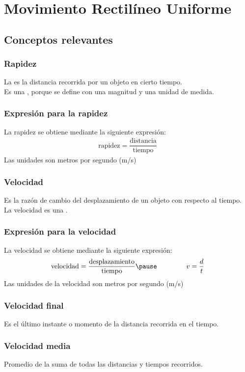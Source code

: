 \documentclass[14pt]{beamer}
\begin{document}
\section{Movimiento Rectilíneo Uniforme}
\subsection{Conceptos relevantes}

\begin{frame}
\frametitle{Rapidez}
La  es la distancia recorrida por un objeto en cierto tiempo.
\\
\bigskip
\pause
Es una , porque se define con una magnitud y una unidad de medida.
\end{frame}
\begin{frame}
\frametitle{Expresión para la rapidez}
La rapidez se obtiene mediante la siguiente expresión:
\pause
\begin{align*}
\text{rapidez} = \dfrac{\text{distancia}}{\text{tiempo}}
\end{align*}
Las unidades son metros por segundo (\unit[per-mode=symbol]{\meter\per\second})
\end{frame}
\begin{frame}
\frametitle{Velocidad}
Es la razón de cambio del desplazamiento de un objeto con respecto al tiempo.
\\
\bigskip
\pause
La velocidad es una .
\end{frame}
\begin{frame}
\frametitle{Expresión para la velocidad}
La velocidad se obtiene mediante la siguiente expresión:
\pause
\begin{eqnarray*}
\begin{aligned}
\text{velocidad} = \dfrac{\text{desplazamiento}}{\text{tiempo}} \pause \hspace*{1.5cm} v = \dfrac{d}{t}
\end{aligned}
\end{eqnarray*}
\pause
Las unidades de la velocidad son metros por segundo (\unit[per-mode=symbol]{\meter\per\second})
\end{frame}
\begin{frame}
\frametitle{Velocidad final}
Es el último instante o momento de la distancia recorrida en el tiempo.
\end{frame}
\begin{frame}
\frametitle{Velocidad media}
Promedio de la suma de todas las distancias y tiempos recorridos.
\end{frame}
\end{document}
